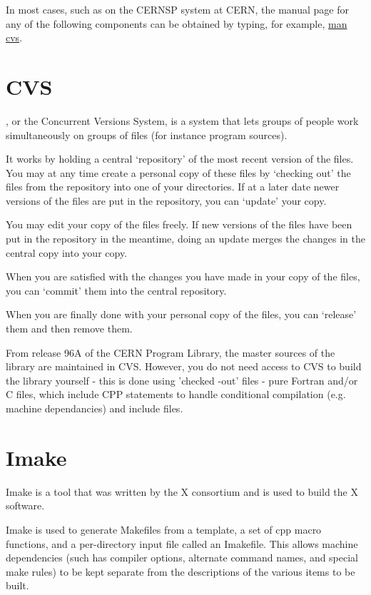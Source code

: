 In most cases, such as on the CERNSP system at CERN, the manual
page for any of the following components can be obtained by
typing, for example, \underline{man cvs}.

\section{CVS}

, or the
Concurrent Versions System, is a system that lets groups of people work 
simultaneously on groups of files (for instance program sources). 

It works by holding a central `repository' of the most recent version of the files. You may
at any time create a personal copy of these files by `checking out' the files from the
repository into one of your directories. If at a later date newer versions of the files are put
in the repository, you can `update' your copy. 

You may edit your copy of the files freely. If new versions of the files have been put in the
repository in the meantime, doing an update merges the changes in the central copy into
your copy. 

When you are satisfied with the changes you have made in your copy of the files, you can
`commit' them into the central repository. 

When you are finally done with your personal copy of the files, you can `release' them and
then remove them. 

From release 96A of the CERN Program Library, the master sources of the library 
are maintained in CVS. However, you do not need access to CVS to build the
library yourself - this is done using 'checked -out' files - pure Fortran and/or C
files, which include CPP statements to handle conditional compilation (e.g. machine
dependancies) and include files.

\section{Imake}

Imake is a tool that was written by the X consortium and is used to build
the X software. 

Imake is used to generate Makefiles from a template, a set
of  cpp  macro  functions,  and a per-directory input file
called an Imakefile.   This  allows  machine  dependencies
(such  has  compiler options, alternate command names, and
special make rules) to be kept separate from the  descriptions of the various items to be built.

